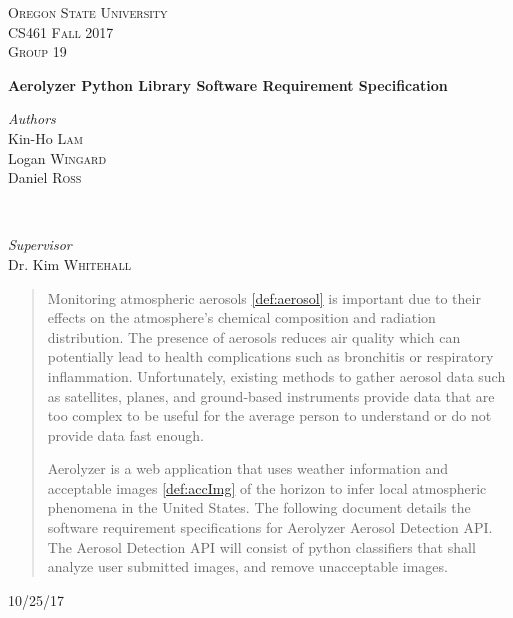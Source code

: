 \documentclass[journal,10pt,draftclsnofoot,onecolumn]{IEEEtran}
\begin{document}
	\begin{titlepage}

	\center

	\textsc{\LARGE Oregon State University}\\[1.5cm]
	\textsc{\Large CS461 Fall 2017 }\\[0.5cm]
	\textsc{\large Group 19}\\[0.5cm] %

	\vfill

	{\huge\bfseries Aerolyzer Python Library Software Requirement Specification}\\[0.4cm]

	\vfill

	\begin{minipage}{0.4\textwidth}
		\begin{flushleft}
			\large
			\textit{Authors}\\
			Kin-Ho \textsc{Lam}\\
			Logan \textsc{Wingard}\\
			Daniel \textsc{Ross}\\
		\end{flushleft}
	\end{minipage}
	~
	\begin{minipage}{0.4\textwidth}
		\begin{flushright}
			\large
			\textit{Supervisor}\\
			Dr. Kim \textsc{Whitehall}
		\end{flushright}
	\end{minipage}

	\vfill

	\begin{abstract}
		\begin{singlespace}
			Monitoring atmospheric aerosols \ref{def:aerosol} is important due to their effects on the atmosphere's chemical composition and radiation distribution.
			The presence of aerosols reduces air quality which can potentially lead to health complications such as bronchitis or respiratory inflammation.
			Unfortunately, existing methods to gather aerosol data such as satellites, planes, and ground-based instruments provide data that are too complex to be useful for the average person to understand or do not provide data fast enough.


			Aerolyzer is a web application that uses weather information and acceptable images \ref{def:accImg} of the horizon to infer local atmospheric phenomena in the United States. 
			The following document details the software requirement specifications for Aerolyzer Aerosol Detection API.
			The Aerosol Detection API will consist of  python classifiers that shall analyze user submitted images, and remove unacceptable images.
		\end{singlespace}
	\end{abstract}

	\vfill
	\vfill
	\vfill
	{\large10/25/17}
	\vfill
\end{titlepage}
\end{document}
